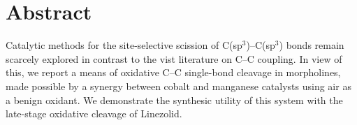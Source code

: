 


\begingroup
\let\clearpage\relax
\let\cleardoublepage\relax
\let\cleardoublepage\relax

\chapter*{Abstract}

Catalytic methods for the site-selective scission of C(sp$^{3}$)--C(sp$^{3}$) bonds remain scarcely explored in contrast to the vist literature on C--C coupling. In view of this, we report a means of oxidative C--C single-bond cleavage in morpholines, made possible by a synergy between cobalt and manganese catalysts using air as a benign oxidant. We demonstrate the synthesic utility of this system with the late-stage oxidative cleavage of Linezolid.

\endgroup			

\vfill
